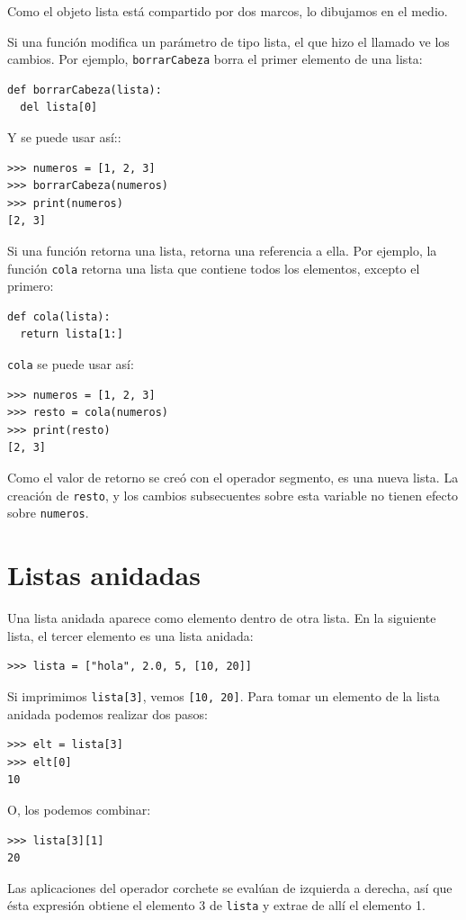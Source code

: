 Como el objeto lista está compartido por dos marcos, lo dibujamos
en el medio.

Si una función modifica un parámetro de tipo lista, el que hizo el
llamado ve los cambios. Por ejemplo, \texttt{borrarCabeza} borra el
primer elemento de una lista:
\begin{lstlisting}
def borrarCabeza(lista):
  del lista[0]
\end{lstlisting}
Y se puede usar así::
\begin{lstlisting}
>>> numeros = [1, 2, 3]
>>> borrarCabeza(numeros)
>>> print(numeros)
[2, 3]
\end{lstlisting}
Si una función retorna una lista, retorna una referencia a ella. Por
ejemplo, la función \texttt{cola} retorna una lista que contiene todos
los elementos, excepto el primero:
\begin{lstlisting}
def cola(lista):
  return lista[1:]
\end{lstlisting}
\texttt{cola} se puede usar así:
\begin{lstlisting}
>>> numeros = [1, 2, 3]
>>> resto = cola(numeros)
>>> print(resto)
[2, 3]
\end{lstlisting}
Como el valor de retorno se creó con el operador segmento, es una
nueva lista. La creación de \texttt{resto}, y los cambios subsecuentes
sobre esta variable no tienen efecto sobre \texttt{numeros}.

\section{Listas anidadas}

\label{nested lists}  

Una lista anidada aparece como elemento dentro de otra lista. En la
siguiente lista, el tercer elemento es una lista anidada:
\begin{lstlisting}
>>> lista = ["hola", 2.0, 5, [10, 20]]
\end{lstlisting}
Si imprimimos \texttt{lista{[}3{]}}, vemos \texttt{{[}10, 20{]}}.
Para tomar un elemento de la lista anidada podemos realizar dos pasos:
\begin{lstlisting}
>>> elt = lista[3]
>>> elt[0]
10
\end{lstlisting}
 O, los podemos combinar:
\begin{lstlisting}
>>> lista[3][1]
20
\end{lstlisting}
Las aplicaciones del operador corchete se evalúan de izquierda a derecha,
así que ésta expresión obtiene el elemento 3 de \texttt{lista} y extrae
de allí el elemento 1.

